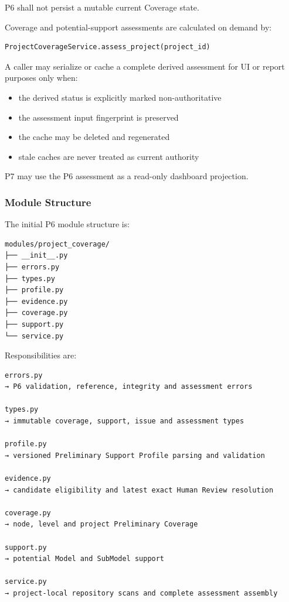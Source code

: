 P6 shall not persist a mutable current Coverage state.

Coverage and potential-support assessments are calculated on demand by:

\begin{verbatim}
ProjectCoverageService.assess_project(project_id)
\end{verbatim}

A caller may serialize or cache a complete derived assessment for UI or report purposes only when:

\begin{itemize}
\tightlist
\item
  the derived status is explicitly marked non-authoritative
\item
  the assessment input fingerprint is preserved
\item
  the cache may be deleted and regenerated
\item
  stale caches are never treated as current authority
\end{itemize}

P7 may use the P6 assessment as a read-only dashboard projection.

\hypertarget{module-structure}{%
\subsubsection{Module Structure}\label{module-structure}}

The initial P6 module structure is:

\begin{verbatim}
modules/project_coverage/
├── __init__.py
├── errors.py
├── types.py
├── profile.py
├── evidence.py
├── coverage.py
├── support.py
└── service.py
\end{verbatim}

Responsibilities are:

\begin{verbatim}
errors.py
→ P6 validation, reference, integrity and assessment errors

types.py
→ immutable coverage, support, issue and assessment types

profile.py
→ versioned Preliminary Support Profile parsing and validation

evidence.py
→ candidate eligibility and latest exact Human Review resolution

coverage.py
→ node, level and project Preliminary Coverage

support.py
→ potential Model and SubModel support

service.py
→ project-local repository scans and complete assessment assembly
\end{verbatim}

